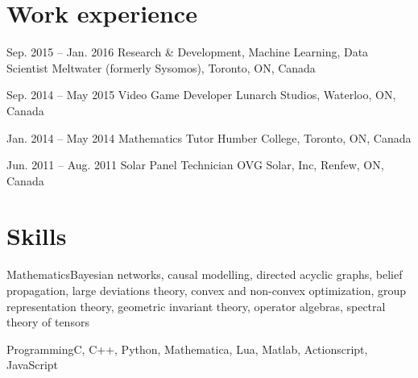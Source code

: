 \documentclass[10pt]{article}
\begin{document}
    \section{Work experience}
    \begin{experiencelist}
        \item{Sep. 2015 -- Jan. 2016}
            {Research \& Development, Machine Learning, Data Scientist}
            {Meltwater (formerly Sysomos), Toronto, ON, Canada}
            {}
        \item{Sep. 2014 -- May 2015}
            {Video Game Developer}
            {Lunarch Studios, Waterloo, ON, Canada}
            {}
        \item{Jan. 2014 -- May 2014}
            {Mathematics Tutor}
            {Humber College, Toronto, ON, Canada}
            {}
        \item{Jun. 2011 -- Aug. 2011}
            {Solar Panel Technician}
            {OVG Solar, Inc, Renfew, ON, Canada}
            {}
    \end{experiencelist}
    \section{Skills}
    \begin{skillslist}
        \item{Mathematics}{Bayesian networks, causal modelling, directed acyclic graphs, belief propagation, large deviations theory, convex and non-convex optimization, group representation theory, geometric invariant theory, operator algebras, spectral theory of tensors}
        \item{Programming}{C, C++, Python, Mathematica, Lua, Matlab, Actionscript, JavaScript}
    \end{skillslist}
    \clearpage
\end{document}
